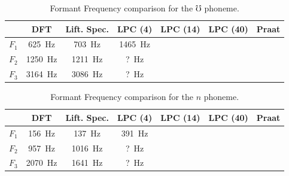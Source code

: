 \documentclass[letterpaper]{article}
\begin{document}
\begin{table}[h]
    \centering
    \begin{tabular}{c||c|c|c|c|c||c}
          & DFT & Lift. Spec. & LPC (4) & LPC (14) & LPC (40) & Praat \\
    \hline
    \hline
    $F_1$ & 625~Hz  &    703~Hz    & 1465~Hz  &     &    &    \\
    $F_2$ & 1250~Hz &    1211~Hz   & ?~Hz     &     &    &    \\
    $F_3$ & 3164~Hz &    3086~Hz   & ?~Hz     &     &    &    \\
    \end{tabular}
    \caption{Formant Frequency comparison for the $\mho$ phoneme.}
    \label{tab:uFormant}
\end{table}


\begin{table}[h]
    \centering
    \begin{tabular}{c||c|c|c|c|c||c}
          & DFT & Lift. Spec. & LPC (4) & LPC (14) & LPC (40) & Praat \\   
    \hline
    \hline
    $F_1$ & 156~Hz &  137~Hz      &  391~Hz   &     &    &    \\
    $F_2$ & 957~Hz &   1016~Hz    &  ?~Hz     &     &    &    \\
    $F_3$ & 2070~Hz &  1641~Hz    &  ?~Hz     &     &    &    \\
    \end{tabular}
    \caption{Formant Frequency comparison for the $n$ phoneme.}
    \label{tab:nFormant}
\end{table}
\end{document}
